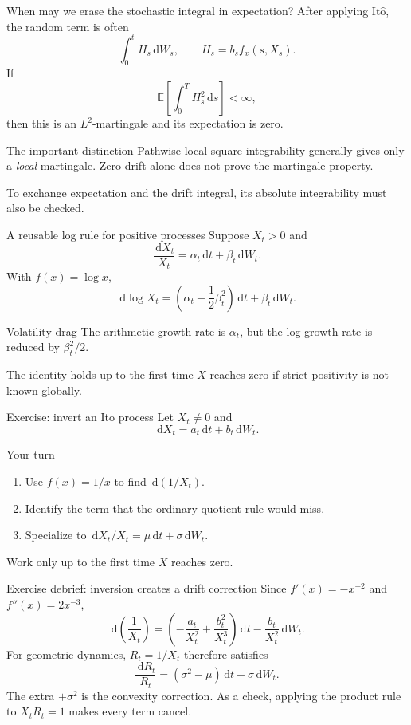 \documentclass[handout,10pt,aspectratio=169]{beamer}
\newcommand{\E}{\mathbb E}
\newcommand{\dd}{\,\mathrm d}
\newcommand{\Ito}{\mathrm{It\hat{o}}}
\begin{document}
\begin{frame}{When may we erase the stochastic integral in expectation?}
After applying \(\Ito\), the random term is often
\[
\int_0^t H_s\dd W_s,
\qquad H_s=b_sf_x(s,X_s).
\]
If
\[
\E\!\left[\int_0^T H_s^2\dd s\right]<\infty,
\]
then this is an \(L^2\)-martingale and its expectation is zero.
\begin{alertblock}{The important distinction}
Pathwise local square-integrability generally gives only a \emph{local} martingale. Zero drift alone does not prove the martingale property.
\end{alertblock}
To exchange expectation and the drift integral, its absolute integrability must also be checked.
\end{frame}

\begin{frame}{A reusable log rule for positive processes}
Suppose \(X_t>0\) and
\[
\frac{\dd X_t}{X_t}=\alpha_t\dd t+\beta_t\dd W_t.
\]
With \(f(x)=\log x\),
\[
\boxed{
\dd\log X_t
=\left(\alpha_t-\frac12\beta_t^2\right)\dd t
+\beta_t\dd W_t.}
\]
\begin{block}{Volatility drag}
The arithmetic growth rate is \(\alpha_t\), but the log growth rate is reduced by \(\beta_t^2/2\).
\end{block}
The identity holds up to the first time \(X\) reaches zero if strict positivity is not known globally.
\end{frame}

\begin{frame}{Exercise: invert an Ito process}
Let \(X_t\neq0\) and
\[
\dd X_t=a_t\dd t+b_t\dd W_t.
\]
\begin{block}{Your turn}
\begin{enumerate}\setlength{\itemsep}{0.45em}
  \item Use \(f(x)=1/x\) to find \(\dd(1/X_t)\).
  \item Identify the term that the ordinary quotient rule would miss.
  \item Specialize to \(\dd X_t/X_t=\mu\dd t+\sigma\dd W_t\).
\end{enumerate}
\end{block}
Work only up to the first time \(X\) reaches zero.
\end{frame}

\begin{frame}{Exercise debrief: inversion creates a drift correction}
Since \(f'(x)=-x^{-2}\) and \(f''(x)=2x^{-3}\),
\[
\boxed{
\dd\!\left(\frac1{X_t}\right)
=\left(-\frac{a_t}{X_t^2}+\frac{b_t^2}{X_t^3}\right)\dd t
-\frac{b_t}{X_t^2}\dd W_t.}
\]
For geometric dynamics, \(R_t=1/X_t\) therefore satisfies
\[
\boxed{\frac{\dd R_t}{R_t}=(\sigma^2-\mu)\dd t-\sigma\dd W_t.}
\]
The extra \(+\sigma^2\) is the convexity correction. As a check, applying the product rule to \(X_tR_t=1\) makes every term cancel.
\end{frame}
\end{document}
